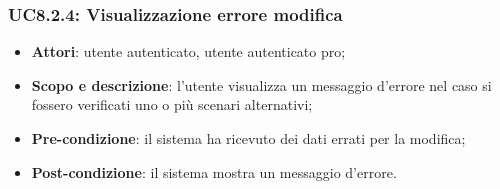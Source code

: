 	\subsubsection{UC8.2.4: Visualizzazione errore modifica}
	\begin{itemize}
		\item
			\textbf{Attori}: utente autenticato, utente autenticato pro;
		\item
			\textbf{Scopo e descrizione}: l'utente visualizza un messaggio d'errore nel caso si fossero verificati uno o più scenari alternativi;
		\item		
			\textbf{Pre-condizione}: il sistema ha ricevuto dei dati errati per la modifica;
		\item
			\textbf{Post-condizione}: il sistema mostra un messaggio d'errore.
	\end{itemize}	
	
